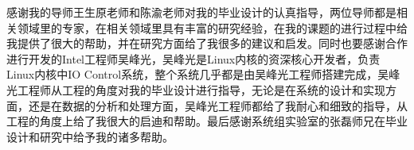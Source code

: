 
\begin{ack}
感谢我的导师王生原老师和陈渝老师对我的毕业设计的认真指导，两位导师都是相关领域里的专家，在相关领域里具有丰富的研究经验，在我的课题的进行过程中给我提供了很大的帮助，并在研究方面给了我很多的建议和启发。同时也要感谢合作进行开发的Intel工程师吴峰光，吴峰光是Linux内核的资深核心开发者，负责Linux内核中IO Control系统，整个系统几乎都是由吴峰光工程师搭建完成，吴峰光工程师从工程的角度对我的毕业设计进行指导，无论是在系统的设计和实现方面，还是在数据的分析和处理方面，吴峰光工程师都给了我耐心和细致的指导，从工程的角度上给了我很大的启迪和帮助。最后感谢系统组实验室的张磊师兄在毕业设计和研究中给予我的诸多帮助。
\end{ack}
